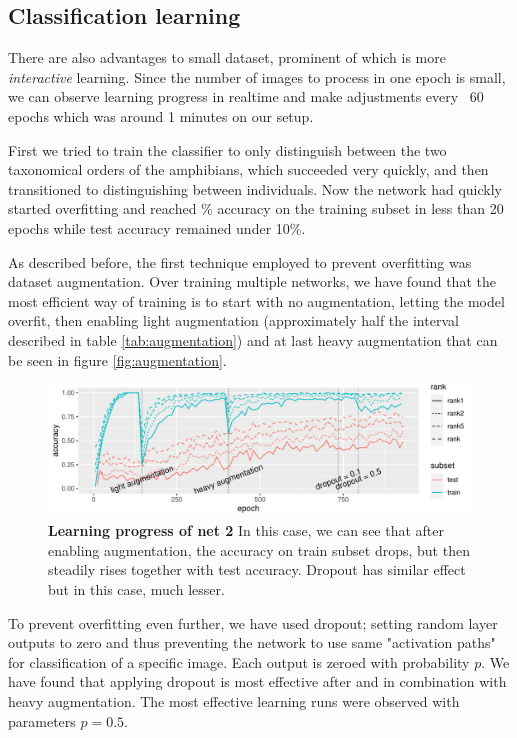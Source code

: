\documentclass[fleqn,moreauthors,10pt]{ds_report}
\begin{document}
\subsection*{Classification learning}

There are also advantages to small dataset, prominent of which is more \textit{interactive} learning. Since the number of images to process in one epoch is small, we can observe learning progress in realtime and make adjustments every ~60 epochs which was around 1 minutes on our setup.

First we tried to train the classifier to only distinguish between the two taxonomical orders of the amphibians, which succeeded very quickly, and then transitioned to distinguishing between individuals. Now the network had quickly started overfitting and reached \% accuracy on the training subset in less than 20 epochs while test accuracy remained under 10\%. 

As described before, the first technique employed to prevent overfitting was dataset augmentation. Over training multiple networks, we have found that the most efficient way of training is to start with no augmentation, letting the model overfit, then enabling light augmentation (approximately half the interval described in table \ref{tab:augmentation}) and at last heavy augmentation that can be seen in figure \ref{fig:augmentation}.

\begin{figure}[ht]\centering
	\includegraphics[width=\linewidth]{learning-progress-ranks.pdf}
	\caption{\textbf{Learning progress of net 2} In this case, we can see that after enabling augmentation, the accuracy on train subset drops, but then steadily rises together with test accuracy. Dropout has similar effect but in this case, much lesser.}
	\label{fig:learning-progress}
\end{figure}

To prevent overfitting even further, we have used dropout; setting random layer outputs to zero and thus preventing the network to use same "activation paths" for classification of a specific image. Each output is zeroed with probability $p$. We have found that applying dropout is most effective after and in combination with heavy augmentation. The most effective learning runs were observed with parameters $p = 0.5$.
\end{document}
